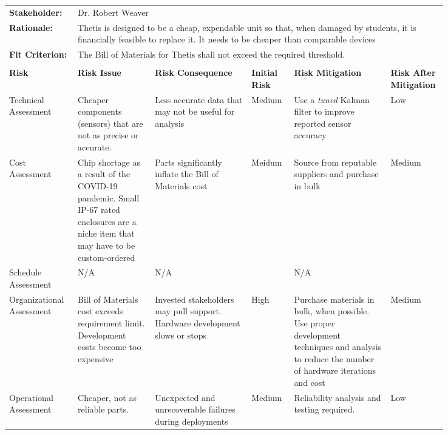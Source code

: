 \begin{landscape}
{\begin{longtable}{| p{0.12\linewidth} | p{0.16\linewidth} |  p{0.20\linewidth} | p{0.08\linewidth} | p{0.20\linewidth} | p{0.08\linewidth} |}
	\hline
	\rowcolor[gray]{0.8}
	\multicolumn{6}{|c|}{ } \\
	\hline
	\textbf{Stakeholder:} & \multicolumn{5}{|l|}{Dr. Robert Weaver} \\
	\hline
	\textbf{Rationale:} & \multicolumn{5}{|p{0.8\linewidth}|}{Thetis is designed to be a cheap, expendable unit so that, when damaged by students, it is financially feasible to replace it. It needs to be cheaper than comparable devices} \\
	\hline
	\textbf{Fit Criterion:} & \multicolumn{5}{|p{0.8\linewidth}|}{The Bill of Materials for Thetis shall not exceed the required threshold.} \\
	\hline
	\rowcolor[gray]{0.8}
	\multicolumn{6}{|c|}{ } \\
	\hline
	\textbf{Risk} & \textbf{Risk Issue} & \textbf{Risk Consequence} & \textbf{Initial Risk} & \textbf{Risk Mitigation} & \textbf{Risk \newline After \newline Mitigation} \\
	\hline
	Technical \newline Assessment & Cheaper components (sensors) that are not as precise or accurate. & Less accurate data that may not be useful for analysis & \cellcolor{yellow} Medium & Use a \emph{tuned} Kalman filter to improve reported sensor accuracy & \cellcolor{green} Low \\
	\hline
	Cost \newline Assessment & Chip shortage as a result of the COVID-19 pandemic. \newline Small IP-67 rated enclosures are a niche item that may have to be custom-ordered & Parts significantly inflate the Bill of Materials cost & \cellcolor{yellow} Meidum & Source from reputable suppliers and purchase in bulk & \cellcolor{yellow} Medium \\
	\hline
	Schedule \newline Assessment & N/A & N/A & \cellcolor[gray]{0.8} & N/A & \cellcolor[gray]{0.8} \\
	\hline
	Organizational \newline Assessment & Bill of Materials cost exceeds requirement limit. \newline Development costs become too expensive & Invested stakeholders may pull support. \newline Hardware development slows or stops & \cellcolor{red} High & Purchase materials in bulk, when possible. \newline Use proper development techniques and analysis to reduce the number of hardware iterations and cost  & \cellcolor{yellow} Medium \\
	\hline
	Operational \newline Assessment & Cheaper, not as reliable parts. & Unexpected and unrecoverable failures during deployments & \cellcolor{yellow} Medium & Reliability analysis and testing required. & \cellcolor{green} Low
	\label{tab:sr04_feasibility}
\end{longtable}
}
\newpage



\end{landscape}
